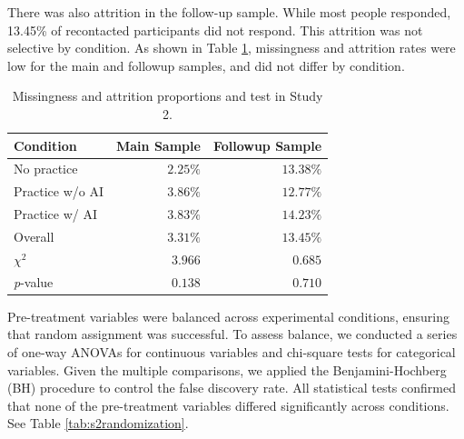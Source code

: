 \documentclass[11pt]{report}
\begin{document}
\begin{append}
There was also attrition in the follow-up sample. While most people responded, 13.45\% of recontacted participants did not respond. This attrition was not selective by condition. As shown in Table \ref{tab:s2missingness}, missingness and attrition rates were low for the main and followup samples, and did not differ by condition.

\begin{table}[h]
    \centering
    \caption{Missingness and attrition proportions and test in Study 2.}

\begin{tabular}{lrr}
\toprule
Condition & Main Sample & Followup Sample \\ 
\midrule
No practice & $2.25\%$ & $13.38\%$ \\ 
Practice w/o AI & $3.86\%$ & $12.77\%$ \\ 
Practice w/ AI & $3.83\%$ & $14.23\%$ \\ 
\midrule
Overall & $3.31\%$ & $13.45\%$ \\ 
\midrule
$\chi^2$ & $3.966$ & $0.685$ \\ 
\textit{p}-value & $0.138$ & $0.710$ \\ 
\bottomrule
\end{tabular}

    \label{tab:s2missingness}
\end{table}

Pre-treatment variables were balanced across experimental conditions, ensuring that random assignment was successful. To assess balance, we conducted a series of one-way ANOVAs for continuous variables and chi-square tests for categorical variables. Given the multiple comparisons, we applied the Benjamini-Hochberg (BH) procedure to control the false discovery rate. All statistical tests confirmed that none of the pre-treatment variables differed significantly across conditions. See Table \ref{tab:s2randomization}.
    

\end{append}
\end{document}
